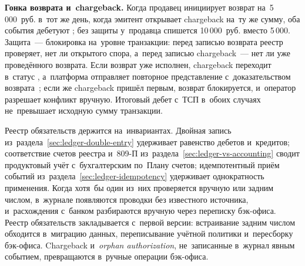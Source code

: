 \textbf{Гонка возврата и~chargeback.} Когда продавец инициирует возврат
на~5\,000~руб. в~тот же день, когда эмитент открывает chargeback на~ту же сумму,
оба события дебетуют ; без защиты у~продавца
спишется 10\,000~руб. вместо 5\,000. Защита~--- блокировка на~уровне
транзакции: перед записью возврата реестр проверяет, нет ли открытого спора,
а~перед записью chargeback~--- нет ли уже проведённого возврата. Если возврат
уже исполнен, chargeback переходит в~статус ,
а~платформа отправляет повторное представление с~доказательством
возврата~\cite{mc-chargeback-guide}; если же chargeback пришёл первым, возврат
блокируется, и~оператор разрешает конфликт вручную. Итоговый дебет с~ТСП
в~обоих случаях не~превышает исходную сумму транзакции.


Реестр обязательств держится на~инвариантах. Двойная запись
из~раздела~\ref{sec:ledger-double-entry} удерживает равенство дебетов
и~кредитов; соответствие счетов реестра и~809-П
из~раздела~\ref{sec:ledger-vs-accounting} сводит продуктовый учёт
с~бухгалтерским по~Плану счетов; идемпотентный приём событий
из~раздела~\ref{sec:ledger-idempotency} удерживает однократность применения.
Когда хотя~бы один из~них проверяется вручную или задним
числом, в~журнале появляются проводки без известного источника, и~расхождения
с~банком разбираются вручную через переписку бэк-офиса. Реестр обязательств
закладывается с~первой версии: встраивание задним числом обходится в~миграцию
данных, переписывание учётной политики и~пересборку бэк-офиса. Chargeback
и~\textit{orphan authorization}, не~записанные в~журнал явным событием,
превращаются в~ручные операции бэк-офиса.
